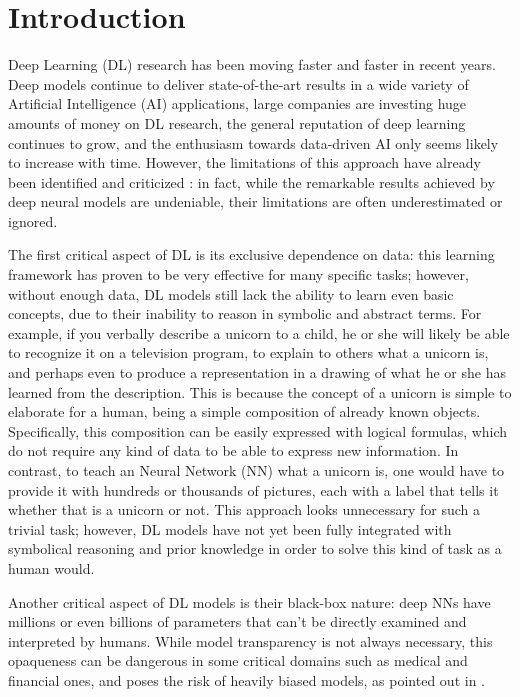 \chapter{Introduction}
\label{introduction}

Deep Learning (DL) research has been moving faster and faster in recent years. Deep models continue to deliver state-of-the-art results in a wide variety of Artificial Intelligence (AI) applications, large companies are investing huge amounts of money on DL research, the general reputation of deep learning continues to grow, and the enthusiasm towards data-driven AI only seems likely to increase with time. However, the limitations of this approach have already been identified and criticized \cite{marcus2018appraisal}: in fact, while the remarkable results achieved by deep neural models are undeniable, their limitations are often underestimated or ignored.

The first critical aspect of DL is its exclusive dependence on data: this learning framework has proven to be very effective for many specific tasks; however, without enough data, DL models still lack the ability to learn even basic concepts, due to their inability to reason in symbolic and abstract terms. For example, if you verbally describe a unicorn to a child, he or she will likely be able to recognize it on a television program, to explain to others what a unicorn is, and perhaps even to produce a representation in a drawing of what he or she has learned from the description. This is because the concept of a unicorn is simple to elaborate for a human, being a simple composition of already known objects. Specifically, this composition can be easily expressed with logical formulas, which do not require any kind of data to be able to express new information.
In contrast, to teach an Neural Network (NN) what a unicorn is, one would have to provide it with hundreds or thousands of pictures, each with a label that tells it whether that is a unicorn or not. This approach looks unnecessary for such a trivial task; however, DL models have not yet been fully integrated with symbolical reasoning and prior knowledge in order to solve this kind of task as a human would. 

Another critical aspect of DL models is their black-box nature: deep NNs have millions or even billions of parameters that can't be directly examined and interpreted by humans.
While model transparency is not always necessary, this opaqueness can be dangerous in some critical domains such as medical and financial ones, and poses the risk of heavily biased models, as pointed out in \cite{o2016weapons}.

